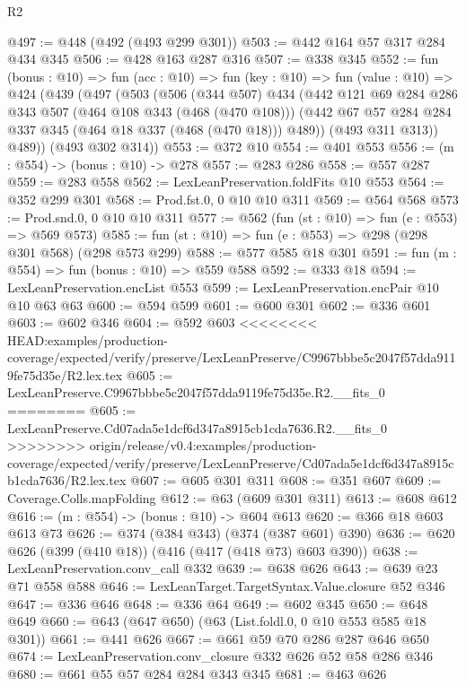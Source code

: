 \begin{lexlean}{R2}
\begin{coremodule}
{{{{{{{{{{{{{{{{{{{{{{@497 := @448 (@492 (@493 @299 @301))
@503 := @442 @164 @57 @317 @284 @434 @345
@506 := @428 @163 @287 @316
@507 := @338 @345
@552 := fun (bonus : @10) =>
  fun (acc : @10) =>
  fun (key : @10) =>
  fun (value : @10) =>
  @424
    (@439
      (@497
        (@503
          (@506
            (@344 @507)
            @434
            (@442
              @121
              @69
              @284
              @286
              @343
              @507
              (@464 @108 @343 (@468 (@470 @108)))
              (@442 @67 @57 @284 @284 @337 @345 (@464 @18 @337 (@468 (@470 @18))) @489))
            (@493 @311 @313))
          @489))
      (@493 @302 @314))
@553 := @372 @10
@554 := @401 @553
@556 := (m : @554) -> (bonus : @10) -> @278
@557 := @283 @286
@558 := @557 @287
@559 := @283 @558
@562 := LexLeanPreservation.foldFits @10 @553
@564 := @352 @299 @301
@568 := Prod.fst.{0, 0} @10 @10 @311
@569 := @564 @568
@573 := Prod.snd.{0, 0} @10 @10 @311
@577 := @562 (fun (st : @10) => fun (e : @553) => @569 @573)
@585 := fun (st : @10) => fun (e : @553) => @298 (@298 @301 @568) (@298 @573 @299)
@588 := @577 @585 @18 @301
@591 := fun (m : @554) => fun (bonus : @10) => @559 @588
@592 := @333 @18
@594 := LexLeanPreservation.encList @553
@599 := LexLeanPreservation.encPair @10 @10 @63 @63
@600 := @594 @599
@601 := @600 @301
@602 := @336 @601
@603 := @602 @346
@604 := @592 @603
<<<<<<<< HEAD:examples/production-coverage/expected/verify/preserve/LexLeanPreserve/C9967bbbe5c2047f57dda9119fe75d35e/R2.lex.tex
@605 := LexLeanPreserve.C9967bbbe5c2047f57dda9119fe75d35e.R2.__fits_0
========
@605 := LexLeanPreserve.Cd07ada5e1dcf6d347a8915cb1cda7636.R2.__fits_0
>>>>>>>> origin/release/v0.4:examples/production-coverage/expected/verify/preserve/LexLeanPreserve/Cd07ada5e1dcf6d347a8915cb1cda7636/R2.lex.tex
@607 := @605 @301 @311
@608 := @351 @607
@609 := Coverage.Colls.mapFolding
@612 := @63 (@609 @301 @311)
@613 := @608 @612
@616 := (m : @554) -> (bonus : @10) -> @604 @613
@620 := @366 @18 @603 @613 @73
@626 := @374 (@384 @343) (@374 (@387 @601) @390)
@636 := @620 @626 (@399 (@410 @18)) (@416 (@417 (@418 @73) @603 @390))
@638 := LexLeanPreservation.conv_call @332
@639 := @638 @626
@643 := @639 @23 @71 @558 @588
@646 := LexLeanTarget.TargetSyntax.Value.closure @52 @346
@647 := @336 @646
@648 := @336 @64
@649 := @602 @345
@650 := @648 @649
@660 := @643 (@647 @650) (@63 (List.foldl.{0, 0} @10 @553 @585 @18 @301))
@661 := @441 @626
@667 := @661 @59 @70 @286 @287 @646 @650
@674 := LexLeanPreservation.conv_closure @332 @626 @52 @58 @286 @346
@680 := @661 @55 @57 @284 @284 @343 @345
@681 := @463 @626
}}}}}}}}}}}}}}}}}}}}}}
\end{coremodule}
\end{lexlean}
